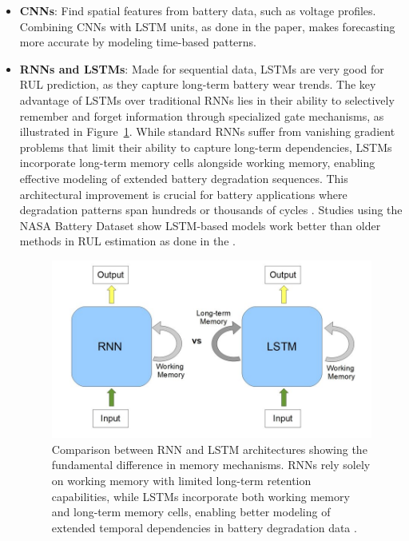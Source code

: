 \begin{itemize}
    \item \textbf{CNNs}: Find spatial features from battery data, such as voltage profiles. Combining CNNs with LSTM units, as done in the \cite{Fangfang_Yang} paper, makes forecasting more accurate by modeling time-based patterns.
    \item \textbf{RNNs and LSTMs}: Made for sequential data, LSTMs are very good for RUL prediction, as they capture long-term battery wear trends. The key advantage of LSTMs over traditional RNNs lies in their ability to selectively remember and forget information through specialized gate mechanisms, as illustrated in Figure~\ref{fig:rnn_vs_lstm_comparison}. While standard RNNs suffer from vanishing gradient problems that limit their ability to capture long-term dependencies, LSTMs incorporate long-term memory cells alongside working memory, enabling effective modeling of extended battery degradation sequences. This architectural improvement is crucial for battery applications where degradation patterns span hundreds or thousands of cycles \cite{noauthor_phenomnet_nodate}. Studies using the NASA Battery Dataset \cite{noauthor_nasa_nodate} show LSTM-based models work better than older methods in RUL estimation as done in the \cite{hong_state--health_2023}.

\begin{figure}[htbp]
\centering
\includegraphics[width=1\textwidth]{imgs/rnn_lstm.png}
\caption{Comparison between RNN and LSTM architectures showing the fundamental difference in memory mechanisms. RNNs rely solely on working memory with limited long-term retention capabilities, while LSTMs incorporate both working memory and long-term memory cells, enabling better modeling of extended temporal dependencies in battery degradation data \cite{noauthor_phenomnet_nodate}.}
\label{fig:rnn_vs_lstm_comparison}
\end{figure}


\end{itemize}
